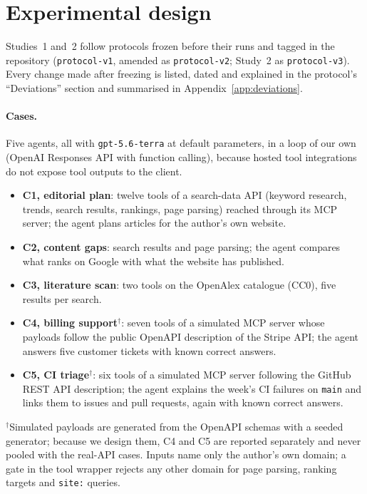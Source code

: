 \section{Experimental design}
\label{sec:design}

Studies~1 and~2 follow protocols frozen before their runs and tagged in the repository (\texttt{protocol-v1},
amended as \texttt{protocol-v2}; Study~2 as \texttt{protocol-v3}). Every change made after freezing is listed,
dated and explained in the protocol's ``Deviations'' section and summarised in Appendix~\ref{app:deviations}.

\paragraph{Cases.} Five agents, all with \texttt{gpt-5.6-terra} at default parameters, in a loop of our own
(OpenAI Responses API with function calling), because hosted tool integrations do not expose tool outputs to the
client.
\begin{itemize}
\item \textbf{C1, editorial plan}: twelve tools of a search-data API (keyword research, trends, search results,
  rankings, page parsing) reached through its MCP server; the agent plans articles for the author's own website.
\item \textbf{C2, content gaps}: search results and page parsing; the agent compares what ranks on Google with
  what the website has published.
\item \textbf{C3, literature scan}: two tools on the OpenAlex catalogue (CC0), five results per search.
\item \textbf{C4, billing support}$^\dagger$: seven tools of a simulated MCP server whose payloads follow the
  public OpenAPI description of the Stripe API; the agent answers five customer tickets with known correct answers.
\item \textbf{C5, CI triage}$^\dagger$: six tools of a simulated MCP server following the GitHub REST API
  description; the agent explains the week's CI failures on \texttt{main} and links them to issues and pull
  requests, again with known correct answers.
\end{itemize}
$^\dagger$Simulated payloads are generated from the OpenAPI schemas with a seeded generator; because we design
them, C4 and C5 are reported separately and never pooled with the real-API cases. Inputs name only the author's
own domain; a gate in the tool wrapper rejects any other domain for page parsing, ranking targets and
\texttt{site:} queries.

